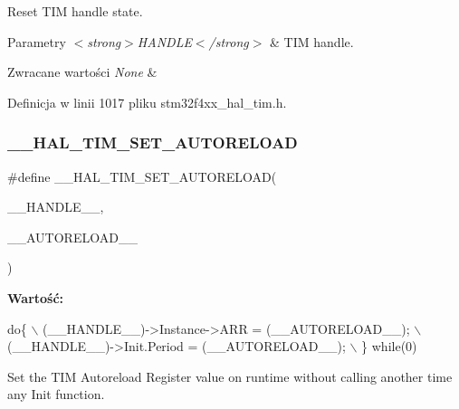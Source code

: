 Reset T\+IM handle state. 


\begin{DoxyParams}{Parametry}
{\em $<$strong$>$\+H\+A\+N\+D\+L\+E$<$/strong$>$} & T\+IM handle. \\
\hline
\end{DoxyParams}

\begin{DoxyRetVals}{Zwracane wartości}
{\em None} & \\
\hline
\end{DoxyRetVals}


Definicja w linii 1017 pliku stm32f4xx\+\_\+hal\+\_\+tim.\+h.

\mbox{\label{group___t_i_m___exported___macros_ga1e6300cab1e34ecaaf490dc7d4812d69}} 
\subsubsection{\texorpdfstring{\+\_\+\+\_\+\+H\+A\+L\+\_\+\+T\+I\+M\+\_\+\+S\+E\+T\+\_\+\+A\+U\+T\+O\+R\+E\+L\+O\+AD}{\_\_HAL\_TIM\_SET\_AUTORELOAD}}
{\footnotesize\ttfamily \#define \+\_\+\+\_\+\+H\+A\+L\+\_\+\+T\+I\+M\+\_\+\+S\+E\+T\+\_\+\+A\+U\+T\+O\+R\+E\+L\+O\+AD(\begin{DoxyParamCaption}\item[{}]{\+\_\+\+\_\+\+H\+A\+N\+D\+L\+E\+\_\+\+\_\+,  }\item[{}]{\+\_\+\+\_\+\+A\+U\+T\+O\+R\+E\+L\+O\+A\+D\+\_\+\+\_\+ }\end{DoxyParamCaption})}

{\bfseries Wartość\+:}
\begin{DoxyCode}
\textcolor{keywordflow}{do}\{                                                    \(\backslash\)
    (\_\_HANDLE\_\_)->Instance->ARR = (\_\_AUTORELOAD\_\_);  \(\backslash\)
    (\_\_HANDLE\_\_)->Init.Period = (\_\_AUTORELOAD\_\_);    \(\backslash\)
  \} \textcolor{keywordflow}{while}(0)
\end{DoxyCode}


Set the T\+IM Autoreload Register value on runtime without calling another time any Init function. 


